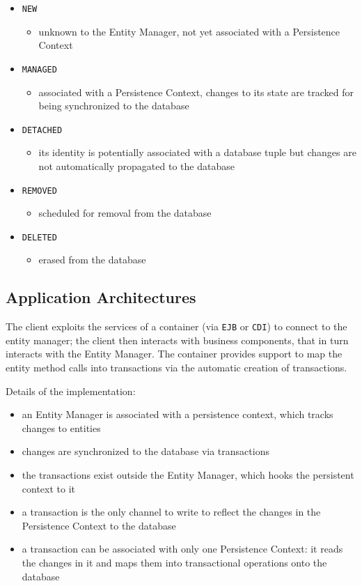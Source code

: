 \documentclass[english]{article}
\begin{document}
\begin{itemize}[label=\texttt{>}]
  \item \texttt{NEW}
        \begin{itemize}
          \item unknown to the Entity Manager, not yet associated with a Persistence Context
        \end{itemize}
  \item \texttt{MANAGED}
        \begin{itemize}
          \item associated with a Persistence Context, changes to its state are tracked for being synchronized to the database
        \end{itemize}
  \item \texttt{DETACHED}
        \begin{itemize}
          \item its identity is potentially associated with a database tuple but changes are not automatically propagated to the database
        \end{itemize}
  \item \texttt{REMOVED}
        \begin{itemize}
          \item scheduled for removal from the database
        \end{itemize}
  \item \texttt{DELETED}
        \begin{itemize}
          \item erased from the database
        \end{itemize}
\end{itemize}

\subsection{\jpa Application Architectures}

The client exploits the services of a container (via \texttt{EJB} or \texttt{CDI}) to connect to the entity manager;
the client then interacts with business components, that in turn interacts with the Entity Manager.
The container provides support to map the \jpa entity method calls into transactions via the automatic creation of transactions.

Details of the implementation:

\begin{itemize}
  \item an Entity Manager is associated with a persistence context, which tracks changes to entities
  \item changes are synchronized to the database via transactions
  \item the transactions exist outside the Entity Manager, which hooks the persistent context to it
  \item a transaction is the only channel to write to reflect the changes in the Persistence Context to the database
  \item a transaction can be associated with only one Persistence Context: it reads the changes in it and maps them into transactional operations onto the database
\end{itemize}
\end{document}
